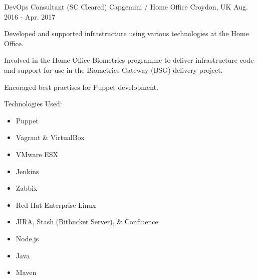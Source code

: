 \begin{cventries}
    \cventry
    {DevOps Consultant (SC Cleared)} %
    {Capgemini / Home Office} %
    {Croydon, UK} %
    {Aug. 2016 - Apr. 2017} %
    {
        \begin{cvitems} %
            \item {Developed and supported infrastructure using various technologies at the Home Office.}
            \item {Involved in the Home Office Biometrics programme to deliver infrastructure code and support for use in the Biometrics Gateway (BSG) delivery project.}
            \item {Encoraged best practises for Puppet development.}
            \item {Technologies Used: }
            \begin{itemize}
                \item {Puppet}
                \item {Vagrant \& VirtualBox}
                \item {VMware ESX}
                \item {Jenkins}
                \item {Zabbix}
                \item {Red Hat Enterprise Linux}
                \item {JIRA, Stash (Bitbucket Server), \& Confluence}
                \item {Node.js}
                \item {Java}
                \item {Maven}
            \end{itemize}
        \end{cvitems}
    }


\end{cventries}
